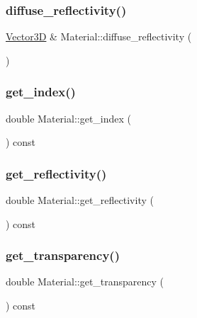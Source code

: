 \mbox{\label{classMaterial_a3f4ff9c259e67dcffa2d607f788fd2a1}} 
\subsubsection{\texorpdfstring{diffuse\_reflectivity()}{diffuse\_reflectivity()}}
{\footnotesize\ttfamily \mbox{\hyperlink{classVector3D}{Vector3D}} \& Material\+::diffuse\+\_\+reflectivity (\begin{DoxyParamCaption}{ }\end{DoxyParamCaption})}

\mbox{\label{classMaterial_a06ebb56a3d99fc1f989910b368248094}} 
\subsubsection{\texorpdfstring{get\_index()}{get\_index()}}
{\footnotesize\ttfamily double Material\+::get\+\_\+index (\begin{DoxyParamCaption}{ }\end{DoxyParamCaption}) const}

\mbox{\label{classMaterial_aed193fc3ec1afe1b7464211bf7f2bf6c}} 
\subsubsection{\texorpdfstring{get\_reflectivity()}{get\_reflectivity()}}
{\footnotesize\ttfamily double Material\+::get\+\_\+reflectivity (\begin{DoxyParamCaption}{ }\end{DoxyParamCaption}) const}

\mbox{\label{classMaterial_a1b5862b5e73cce657acdba131e9b27e0}} 
\subsubsection{\texorpdfstring{get\_transparency()}{get\_transparency()}}
{\footnotesize\ttfamily double Material\+::get\+\_\+transparency (\begin{DoxyParamCaption}{ }\end{DoxyParamCaption}) const}

